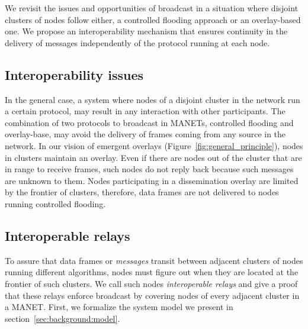 We revisit the issues and opportunities of broadcast in a situation where disjoint clusters of nodes follow either, a controlled flooding approach or an overlay-based one.
%
We propose an interoperability mechanism that ensures continuity in the delivery of messages independently of the protocol running at each node.

\subsection{Interoperability issues}
\label{sec:mechanisms:interop-issues}
In the general case, a system where nodes of a disjoint cluster in the network run a certain protocol, may result in any interaction with other participants.
%
The combination of two protocols to broadcast in MANETs, controlled flooding and overlay-base, may avoid the delivery of frames coming from any source in the network.
%
In our vision of emergent overlays (Figure~\ref{fig:general_principle}), nodes in clusters maintain an overlay.
%
Even if there are nodes out of the cluster that are in range to receive frames, such nodes do not reply back because such messages are unknown to them.
%
Nodes participating in a dissemination overlay are limited by the frontier of clusters, therefore, data frames are not delivered to nodes running controlled flooding.

\subsection{Interoperable relays}
\label{sec:mechanisms:interop-relays}

To assure that data frames or \emph{messages} transit between adjacent clusters of nodes running different algorithms, nodes must figure out when they are located at the frontier of such clusters.
%
We call such nodes \emph{interoperable relays}  and give a proof that these relays enforce broadcast by covering nodes of every adjacent cluster in a MANET.
%
First, we formalize the system model we present in section~\ref{sec:background:model}.

